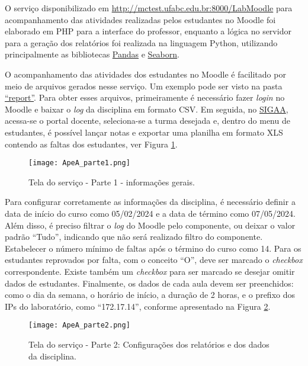 O serviço disponibilizado em \url{http://mctest.ufabc.edu.br:8000/LabMoodle} para acompanhamento das atividades realizadas pelos estudantes no Moodle foi elaborado em PHP para a interface do professor, enquanto a lógica no servidor para a geração dos relatórios foi realizada na linguagem Python, utilizando principalmente as bibliotecas \href{https://pandas.pydata.org}{Pandas} e \href{https://seaborn.pydata.org}{Seaborn}.

O acompanhamento das atividades dos estudantes no Moodle é facilitado por meio de arquivos gerados nesse serviço. Um exemplo pode ser visto na pasta \href{http://mctest.ufabc.edu.br:8000/LabMoodle/modelos/report}{``report''}. Para obter esses arquivos, primeiramente é necessário fazer \textit{login} no Moodle e baixar o \textit{log} da disciplina em formato CSV. Em seguida, no \href{https://sig.ufabc.edu.br/sigaa/verTelaLogin.do}{SIGAA}, acessa-se o portal docente, seleciona-se a turma desejada e, dentro do menu de estudantes, é possível lançar notas e exportar uma planilha em formato XLS contendo as faltas dos estudantes, ver Figura \ref{fig:ApeA_parte1}.

\begin{figure}[!ht]
    \centering
    \texttt{[image: ApeA\_parte1.png]}
     \caption{Tela do serviço - Parte 1 - informações gerais.}
  \label{fig:ApeA_parte1}
  \end{figure}


Para configurar corretamente as informações da disciplina, é necessário definir a data de início do curso como 05/02/2024 e a data de término como 07/05/2024. Além disso, é preciso filtrar o \textit{log} do Moodle pelo componente, ou deixar o valor padrão ``Tudo'', indicando que não será realizado filtro do componente. Estabelecer o número mínimo de faltas após o término do curso como 14. Para os estudantes reprovados por falta, com o conceito ``O'', deve ser marcado o \textit{checkbox} correspondente. Existe também um \textit{checkbox} para ser marcado se desejar omitir dados de estudantes. Finalmente, os dados de cada aula devem ser preenchidos: como o dia da semana, o horário de início, a duração de 2 horas, e o prefixo dos IPs do laboratório, como ``172.17.14'', conforme apresentado na Figura \ref{fig:ApeA_parte2}.


  \begin{figure}[!ht]
    \centering
    \texttt{[image: ApeA\_parte2.png]}
     \caption{Tela do serviço - Parte 2: Configurações dos relatórios e dos dados da disciplina.}
  \label{fig:ApeA_parte2}
  \end{figure}


